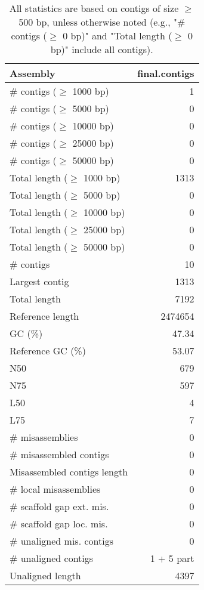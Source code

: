 \documentclass[12pt,a4paper]{article}
\begin{document}
\begin{table}[ht]
\begin{center}
\caption{All statistics are based on contigs of size $\geq$ 500 bp, unless otherwise noted (e.g., "\# contigs ($\geq$ 0 bp)" and "Total length ($\geq$ 0 bp)" include all contigs).}
\begin{tabular}{|l*{1}{|r}|}
\hline
Assembly & final.contigs \\ \hline
\# contigs ($\geq$ 1000 bp) & 1 \\ \hline
\# contigs ($\geq$ 5000 bp) & 0 \\ \hline
\# contigs ($\geq$ 10000 bp) & 0 \\ \hline
\# contigs ($\geq$ 25000 bp) & 0 \\ \hline
\# contigs ($\geq$ 50000 bp) & 0 \\ \hline
Total length ($\geq$ 1000 bp) & 1313 \\ \hline
Total length ($\geq$ 5000 bp) & 0 \\ \hline
Total length ($\geq$ 10000 bp) & 0 \\ \hline
Total length ($\geq$ 25000 bp) & 0 \\ \hline
Total length ($\geq$ 50000 bp) & 0 \\ \hline
\# contigs & 10 \\ \hline
Largest contig & 1313 \\ \hline
Total length & 7192 \\ \hline
Reference length & 2474654 \\ \hline
GC (\%) & 47.34 \\ \hline
Reference GC (\%) & 53.07 \\ \hline
N50 & 679 \\ \hline
N75 & 597 \\ \hline
L50 & 4 \\ \hline
L75 & 7 \\ \hline
\# misassemblies & 0 \\ \hline
\# misassembled contigs & 0 \\ \hline
Misassembled contigs length & 0 \\ \hline
\# local misassemblies & 0 \\ \hline
\# scaffold gap ext. mis. & 0 \\ \hline
\# scaffold gap loc. mis. & 0 \\ \hline
\# unaligned mis. contigs & 0 \\ \hline
\# unaligned contigs & 1 + 5 part \\ \hline
Unaligned length & 4397 \\ \hline

\end{tabular}
\end{center}
\end{table}
\end{document}
